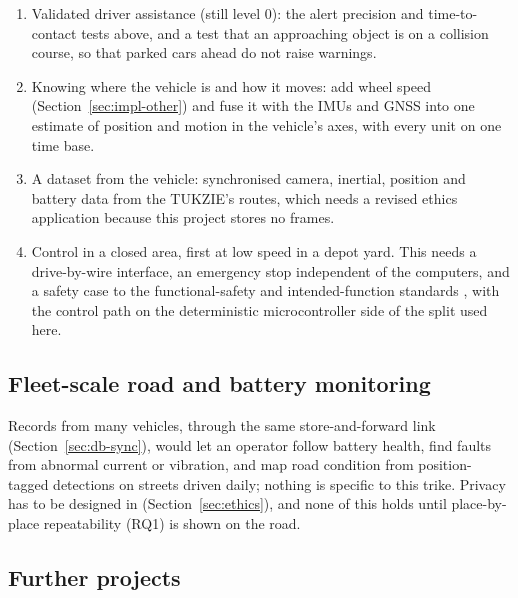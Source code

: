 \begin{enumerate}
\item Validated driver assistance (still level 0): the alert precision and time-to-contact tests above, and a test that an approaching object is on a collision course, so that parked cars ahead do not raise warnings.
\item Knowing where the vehicle is and how it moves: add wheel speed (Section~\ref{sec:impl-other}) and fuse it with the IMUs and GNSS into one estimate of position and motion in the vehicle's axes, with every unit on one time base.
\item A dataset from the vehicle: synchronised camera, inertial, position and battery data from the TUKZIE's routes, which needs a revised ethics application because this project stores no frames.
\item Control in a closed area, first at low speed in a depot yard. This needs a drive-by-wire interface, an emergency stop independent of the computers, and a safety case to the functional-safety and intended-function standards \cite{iso26262, iso21448}, with the control path on the deterministic microcontroller side of the split used here.
\end{enumerate}

\subsection{Fleet-scale road and battery monitoring}
\label{sec:recs-bigger}

Records from many vehicles, through the same store-and-forward link (Section~\ref{sec:db-sync}), would let an operator follow battery health, find faults from abnormal current or vibration, and map road condition from position-tagged detections on streets driven daily; nothing is specific to this trike. Privacy has to be designed in (Section~\ref{sec:ethics}), and none of this holds until place-by-place repeatability (RQ1) is shown on the road.

\subsection{Further projects}


